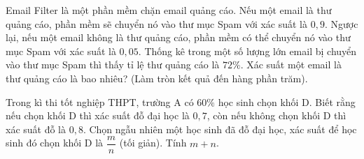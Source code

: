\begin{bt}%
	Email Filter là một phần mềm chặn email quảng cáo. Nếu một email là thư quảng cáo, phần mềm sẽ chuyển nó vào thư mục Spam với xác suất là $0{,}9$. Ngược lại, nếu một email không là thư quảng cáo, phần mềm có thể chuyển nó vào thư mục Spam với xác suất là $0{,}05$. Thống kê trong một số lượng lớn email bị chuyển vào thư mục Spam thì thấy tỉ lệ thư quảng cáo là $72\%$. Xác suất một email là thư quảng  cáo là bao nhiêu? (Làm tròn kết quả đến hàng phần trăm).
\end{bt}

\begin{bt}%
	 Trong kì thi tốt nghiệp THPT, trường A có $60\%$ học sinh chọn khối D. Biết rằng nếu chọn khối D thì xác suất đỗ đại học là $0{,}7$, còn nếu không chọn khối D thì xác suất đỗ là $0{,}8$. Chọn ngẫu nhiên một học sinh đã đỗ đại học, xác suất để học sinh đó chọn khối D là $\dfrac{m}{n}$ (tối giản). Tính $m+n$.
\end{bt}

